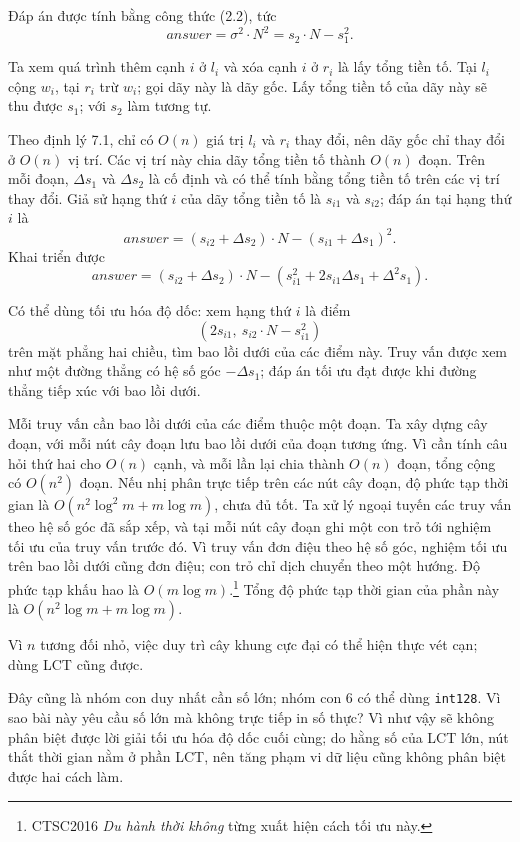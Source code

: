 \documentclass[11pt]{article}
\begin{document}
Đáp án được tính bằng công thức (2.2), tức
\[
  \textit{answer}=\sigma^2\cdot N^2=s_2\cdot N-s_1^2.
\]

Ta xem quá trình thêm cạnh \(i\) ở \(l_i\) và xóa cạnh \(i\) ở \(r_i\) là lấy
tổng tiền tố. Tại \(l_i\) cộng \(w_i\), tại \(r_i\) trừ \(w_i\); gọi dãy này là
dãy gốc. Lấy tổng tiền tố của dãy này sẽ thu được \(s_1\); với \(s_2\) làm
tương tự.

Theo định lý 7.1, chỉ có \(O(n)\) giá trị \(l_i\) và \(r_i\) thay đổi, nên dãy
gốc chỉ thay đổi ở \(O(n)\) vị trí. Các vị trí này chia dãy tổng tiền tố thành
\(O(n)\) đoạn. Trên mỗi đoạn, \(\Delta s_1\) và \(\Delta s_2\) là cố định và có
thể tính bằng tổng tiền tố trên các vị trí thay đổi. Giả sử hạng thứ \(i\) của
dãy tổng tiền tố là \(s_{i1}\) và \(s_{i2}\); đáp án tại hạng thứ \(i\) là
\[
  \textit{answer}=(s_{i2}+\Delta s_2)\cdot N-(s_{i1}+\Delta s_1)^2. \tag{7.1}
\]
Khai triển được
\[
  \textit{answer}
  =(s_{i2}+\Delta s_2)\cdot N
    -(s_{i1}^2+2s_{i1}\Delta s_1+\Delta^2 s_1). \tag{7.2}
\]

Có thể dùng tối ưu hóa độ dốc: xem hạng thứ \(i\) là điểm
\[
  (2s_{i1},\ s_{i2}\cdot N-s_{i1}^2)
\]
trên mặt phẳng hai chiều, tìm bao lồi dưới của các điểm này. Truy vấn được xem
như một đường thẳng có hệ số góc \(-\Delta s_1\); đáp án tối ưu đạt được khi
đường thẳng tiếp xúc với bao lồi dưới.

Mỗi truy vấn cần bao lồi dưới của các điểm thuộc một đoạn. Ta xây dựng cây đoạn,
với mỗi nút cây đoạn lưu bao lồi dưới của đoạn tương ứng. Vì cần tính câu hỏi
thứ hai cho \(O(n)\) cạnh, và mỗi lần lại chia thành \(O(n)\) đoạn, tổng cộng có
\(O(n^2)\) đoạn. Nếu nhị phân trực tiếp trên các nút cây đoạn, độ phức tạp thời
gian là \(O(n^2\log^2 m+m\log m)\), chưa đủ tốt. Ta xử lý ngoại tuyến các truy
vấn theo hệ số góc đã sắp xếp, và tại mỗi nút cây đoạn ghi một con trỏ tới
nghiệm tối ưu của truy vấn trước đó. Vì truy vấn đơn điệu theo hệ số góc, nghiệm
tối ưu trên bao lồi dưới cũng đơn điệu; con trỏ chỉ dịch chuyển theo một hướng.
Độ phức tạp khấu hao là \(O(m\log m)\).\footnote{CTSC2016 \emph{Du hành thời
không} từng xuất hiện cách tối ưu này.} Tổng độ phức tạp thời gian của phần này
là \(O(n^2\log m+m\log m)\).

Vì \(n\) tương đối nhỏ, việc duy trì cây khung cực đại có thể hiện thực vét
cạn; dùng LCT cũng được.

Đây cũng là nhóm con duy nhất cần số lớn; nhóm con 6 có thể dùng
\texttt{int128}. Vì sao bài này yêu cầu số lớn mà không trực tiếp in số thực?
Vì như vậy sẽ không phân biệt được lời giải tối ưu hóa độ dốc cuối cùng; do
hằng số của LCT lớn, nút thắt thời gian nằm ở phần LCT, nên tăng phạm vi dữ
liệu cũng không phân biệt được hai cách làm.
\end{document}
